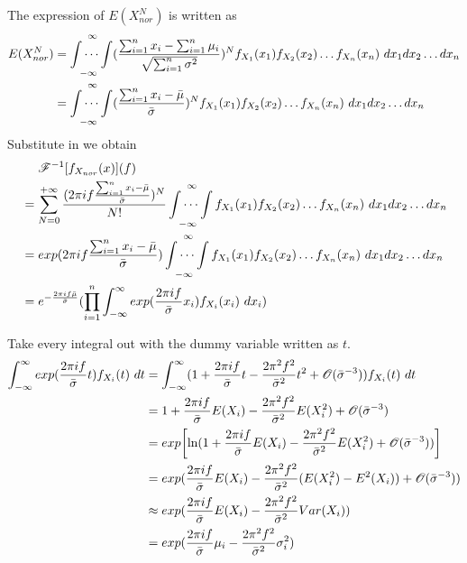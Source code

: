 \documentclass[11pt]{article}
\begin{document}
The expression of $E(X_{nor}^N)$ is written as
\begin{equation}
\begin{aligned}
    E(X_{nor}^N) &= \idotsint \limits_{-\infty}^{~~\infty}(\frac{\sum_{i=1}^{n}x_i - \sum_{i=1}^{n}\mu_i}{\sqrt{\sum_{i=1}^{n}\sigma^2}})^N f_{X_1}(x_1) f_{X_2}(x_2) \dots f_{X_n}(x_n)~dx_1 dx_2 \dots dx_n \\
    &= \idotsint \limits_{-\infty}^{~~\infty}(\frac{\sum_{i=1}^{n}x_i - \bar \mu}{\bar \sigma})^N f_{X_1}(x_1) f_{X_2}(x_2) \dots f_{X_n}(x_n) ~dx_1 dx_2 \dots dx_n \notag
\end{aligned}
\end{equation}
Substitute in we obtain
\begin{equation}
\begin{aligned}
    & ~~~~\mathscr{F}^{-1}[f_{X_{nor}}(x)](f) \\ &= \sum^{+\infty}_{N=0}\frac{(2 \pi i f \frac{\sum_{i=1}^{n}x_i - \bar \mu}{\bar \sigma})^N}{N!} \idotsint \limits_{-\infty}^{~~\infty} f_{X_1}(x_1) f_{X_2}(x_2) \dots f_{X_n}(x_n) ~dx_1 dx_2 \dots dx_n  \\
    & = exp(2 \pi i f \frac{\sum^n_{i=1}x_i - \bar \mu}{\bar \sigma}) \idotsint \limits_{-\infty}^{~~\infty} f_{X_1}(x_1) f_{X_2}(x_2) \dots f_{X_n}(x_n) ~dx_1 dx_2 \dots dx_n \\
    &= e^{-\frac{2 \pi i f \bar \mu}{\bar \sigma}}(\prod_{i=1}^{n} \int^{\infty}_{-\infty} exp(\frac{2 \pi i f}{\bar \sigma} x_i)f_{X_{i}}(x_i) ~dx_i) 
\end{aligned}
\end{equation} \par 
\indent \par \noindent Take every integral out with the dummy variable written as $t$. 
\begin{equation}
\begin{aligned}
    \int^{\infty}_{-\infty} exp(\frac{2 \pi i f}{\bar \sigma} t )f_{X_i}(t)~dt &= \int^{\infty}_{-\infty} (1+\frac{2 \pi i f}{\bar \sigma}t - \frac{2 \pi^2 f^2}{\bar \sigma^2} t^2 + \mathscr{O}(\bar \sigma^{-3}))f_{X_i}(t)~dt \\
    & =  1+\frac{2 \pi i f}{\bar \sigma}E(X_i) - \frac{2 \pi^2 f^2}{\bar \sigma^2} E(X_i^2)+ \mathscr{O}(\bar \sigma^{-3}) \\
    &=  exp\bigg[\text{ln}(1+\frac{2 \pi i f}{\bar \sigma}E(X_i) - \frac{2 \pi^2 f^2}{\bar \sigma^2} E(X_i^2)+ \mathscr{O}(\bar \sigma^{-3}))\bigg] \\
    & = exp(\frac{2 \pi i f}{\bar \sigma} E(X_i) - \frac{2 \pi^2 f^2}{\bar \sigma^2} (E(X_i^2) - E^2(X_i)) + \mathscr{O}(\bar \sigma^{-3})) \\
    & \approx exp(\frac{2 \pi i f}{\bar \sigma} E(X_i) - \frac{2\pi^2 f^2}{\bar \sigma^2} Var(X_i)) \\
    &=  exp(\frac{2 \pi i f}{\bar \sigma} \mu_i - \frac{2\pi^2 f^2}{\bar \sigma^2} \sigma_i^2) \notag
\end{aligned}
\end{equation}
\end{document}
